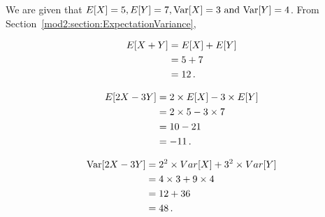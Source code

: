 %
%

\begin{subquestions}
	

\subquestion

 We are given that $E[X]=5, E[Y]=7, \text{Var}[X]=3 ~\text{and}~ \text{Var}[Y]=4$. From Section~\ref{mod2:section:ExpectationVariance},

\begin{subsubquestions}
	
\subsubquestion

\begin{align}
	E[X+Y] & = E[X] + E[Y] \nonumber \\
	       & = 5 + 7 \nonumber \\
	       & = 12 \,.
\end{align}


\subsubquestion

\begin{align}
	E[2X-3Y] & = 2 \times E[X] - 3 \times E[Y] \nonumber \\
	& = 2 \times 5 - 3 \times 7 \nonumber \\
	& = 10 - 21 \nonumber \\
	& = -11 \,.
\end{align}


\subsubquestion

\begin{align}
	\text{Var}[2X-3Y] & = 2^2 \times Var[X] + 3^2 \times Var[Y] \nonumber \\
	           & = 4 \times 3 + 9 \times 4 \nonumber \\
	           & = 12 + 36 \nonumber \\
	           & = 48 \,.	
\end{align}


\end{subsubquestions}
\end{subquestions}
